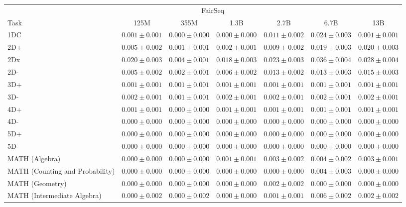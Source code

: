 \documentclass[11pt]{article}
\begin{document}
{\begin{landscape}
\begin{table}
\centering 
\begin{tabular}{l c c c c c c } \\ 
& \multicolumn{4}{c}{FairSeq} \\ 
Task & 125M & 355M & 1.3B & 2.7B & 6.7B & 13B \\ \toprule
1DC & $0.001 \pm 0.001$ & $0.000 \pm 0.000$ & $0.000 \pm 0.000$ & $0.011 \pm 0.002$ & $0.024 \pm 0.003$ & $0.001 \pm 0.001$ \\ 
2D+ & $0.005 \pm 0.002$ & $0.001 \pm 0.001$ & $0.002 \pm 0.001$ & $0.009 \pm 0.002$ & $0.019 \pm 0.003$ & $0.020 \pm 0.003$ \\ 
2Dx & $0.020 \pm 0.003$ & $0.004 \pm 0.001$ & $0.018 \pm 0.003$ & $0.023 \pm 0.003$ & $0.036 \pm 0.004$ & $0.028 \pm 0.004$ \\ 
2D- & $0.005 \pm 0.002$ & $0.002 \pm 0.001$ & $0.006 \pm 0.002$ & $0.013 \pm 0.002$ & $0.013 \pm 0.003$ & $0.015 \pm 0.003$ \\ 
3D+ & $0.001 \pm 0.001$ & $0.001 \pm 0.001$ & $0.001 \pm 0.001$ & $0.001 \pm 0.001$ & $0.001 \pm 0.001$ & $0.001 \pm 0.001$ \\ 
3D- & $0.002 \pm 0.001$ & $0.001 \pm 0.001$ & $0.002 \pm 0.001$ & $0.002 \pm 0.001$ & $0.002 \pm 0.001$ & $0.002 \pm 0.001$ \\ 
4D+ & $0.001 \pm 0.001$ & $0.000 \pm 0.000$ & $0.001 \pm 0.001$ & $0.001 \pm 0.001$ & $0.001 \pm 0.001$ & $0.001 \pm 0.001$ \\ 
4D- & $0.000 \pm 0.000$ & $0.000 \pm 0.000$ & $0.000 \pm 0.000$ & $0.000 \pm 0.000$ & $0.000 \pm 0.000$ & $0.000 \pm 0.000$ \\ 
5D+ & $0.000 \pm 0.000$ & $0.000 \pm 0.000$ & $0.000 \pm 0.000$ & $0.000 \pm 0.000$ & $0.000 \pm 0.000$ & $0.000 \pm 0.000$ \\ 
5D- & $0.000 \pm 0.000$ & $0.000 \pm 0.000$ & $0.000 \pm 0.000$ & $0.000 \pm 0.000$ & $0.000 \pm 0.000$ & $0.000 \pm 0.000$ \\ 
MATH (Algebra) & $0.000 \pm 0.000$ & $0.000 \pm 0.000$ & $0.001 \pm 0.001$ & $0.003 \pm 0.002$ & $0.004 \pm 0.002$ & $0.003 \pm 0.001$ \\ 
MATH (Counting and Probability) & $0.000 \pm 0.000$ & $0.000 \pm 0.000$ & $0.000 \pm 0.000$ & $0.000 \pm 0.000$ & $0.004 \pm 0.003$ & $0.000 \pm 0.000$ \\ 
MATH (Geometry) & $0.000 \pm 0.000$ & $0.000 \pm 0.000$ & $0.000 \pm 0.000$ & $0.002 \pm 0.002$ & $0.000 \pm 0.000$ & $0.000 \pm 0.000$ \\ 
MATH (Intermediate Algebra) & $0.000 \pm 0.002$ & $0.000 \pm 0.002$ & $0.000 \pm 0.000$ & $0.001 \pm 0.001$ & $0.006 \pm 0.002$ & $0.002 \pm 0.002$ \\ 

\end{tabular}
\end{table}
\end{landscape}}
\end{document}
